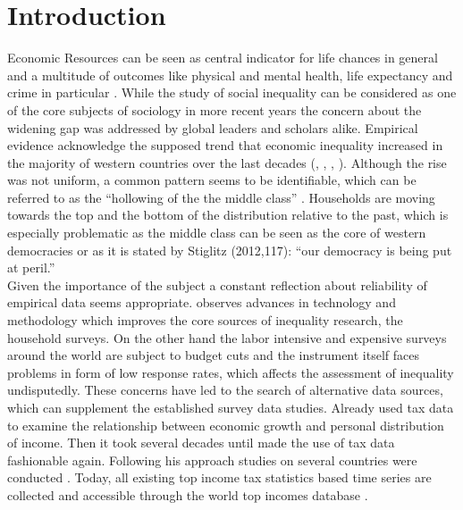 
\section{Introduction}



Economic Resources can be seen as central indicator for life chances in general and a multitude of outcomes like physical and mental health, life expectancy and crime in particular \citep{wilkinson_income_2009}. While the study of social inequality can be considered as one of the core subjects of sociology in more recent years the concern about the widening gap was addressed by global leaders \citep{world_economic_forum_global_2013} and scholars alike. Empirical evidence acknowledge the supposed trend that economic inequality increased in the majority of western countries over the last decades (\citealt{OECD, 2008 FEHLT}, \citealt{oecd_divided_2011}, \citealt{gornick_income_2013}, \citealt{salverda_changing_2014}). Although the rise was not uniform, a common pattern seems to be identifiable, which can be referred to as the ``hollowing of the the middle class'' \citep{Alderson and Doran 2013 FEHLT}. Households are moving towards the top and the bottom of the distribution relative to the past, which is especially problematic as the middle class can be seen as the core of western democracies or as it is stated by Stiglitz (2012,117): ``our democracy is being put at peril.''
\\


Given the importance of the subject a constant reflection about reliability of empirical data seems appropriate. \citet[8]{Atkinson 2013:8 FEHLT} observes advances in technology and methodology which improves the core sources of inequality research, the household surveys.  On the other hand the labor intensive and expensive surveys around the world are subject to budget cuts and the instrument itself faces problems in form of low response rates, which affects the assessment of inequality undisputedly. These concerns have led to the search of alternative data sources, which can supplement the established survey data studies. Already \citet{kuznets_economic_1955} used tax data to examine the relationship between economic growth and personal distribution of income. Then it took several decades until \citet{piketty_les_2001, piketty_income_2003,piketty_income_2003-1} made the use of tax data fashionable again. Following his approach studies on several countries were conducted \citep{atkinson_top_2007,atkinson_top_2010}. Today, all existing top income tax statistics based time series are collected and accessible through the world top incomes database \citep{Alvaredo et al. 2014 FEHLT}. \\

